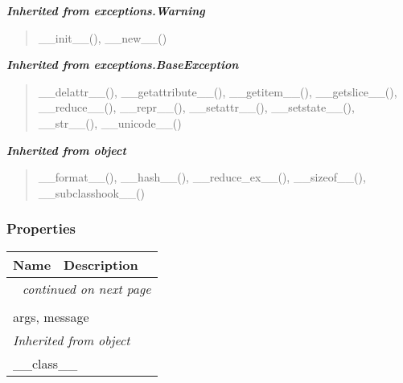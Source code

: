 \large{\textbf{\textit{Inherited from exceptions.Warning}}}

\begin{quote}
\_\_init\_\_(), \_\_new\_\_()
\end{quote}

\large{\textbf{\textit{Inherited from exceptions.BaseException}}}

\begin{quote}
\_\_delattr\_\_(), \_\_getattribute\_\_(), \_\_getitem\_\_(), \_\_getslice\_\_(), \_\_reduce\_\_(), \_\_repr\_\_(), \_\_setattr\_\_(), \_\_setstate\_\_(), \_\_str\_\_(), \_\_unicode\_\_()
\end{quote}

\large{\textbf{\textit{Inherited from object}}}

\begin{quote}
\_\_format\_\_(), \_\_hash\_\_(), \_\_reduce\_ex\_\_(), \_\_sizeof\_\_(), \_\_subclasshook\_\_()
\end{quote}


  \subsubsection{Properties}

    \vspace{-1cm}
\hspace{\varindent}\begin{longtable}{|p{\varnamewidth}|p{\vardescrwidth}|l}
\cline{1-2}
\cline{1-2} \centering \textbf{Name} & \centering \textbf{Description}& \\
\cline{1-2}
\endhead\cline{1-2}\multicolumn{3}{r}{\small\textit{continued on next page}}\\\endfoot\cline{1-2}
\endlastfoot\multicolumn{2}{|l|}{\textit{Inherited from exceptions.BaseException}}\\
\multicolumn{2}{|p{\varwidth}|}{\raggedright args, message}\\
\cline{1-2}
\multicolumn{2}{|l|}{\textit{Inherited from object}}\\
\multicolumn{2}{|p{\varwidth}|}{\raggedright \_\_class\_\_}\\
\cline{1-2}
\end{longtable}

